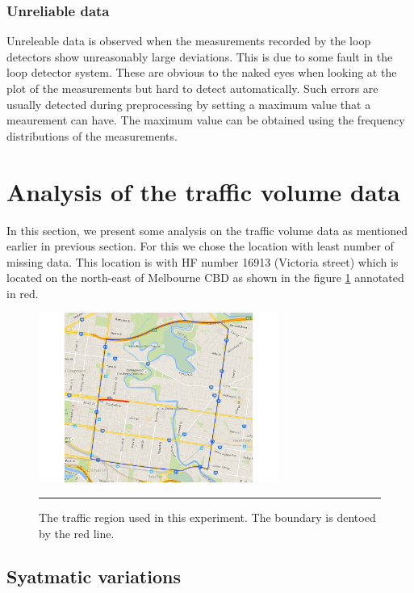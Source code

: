 \subsubsection{Unreliable data}
Unreleable data is observed when the measurements recorded by the loop detectors show unreasonably
large deviations. This is due to some fault in the loop detector system. These are obvious to the
naked eyes when looking at the plot of the measurements but hard to detect automatically. Such errors
are usually detected during preprocessing by setting a maximum value that a meaurement can have. The
maximum value can be obtained using the frequency distributions of the measurements.

\section{Analysis of the traffic volume data}

In this section, we present some analysis on the traffic volume data as mentioned earlier in previous
section. For this we chose the location with least number of missing data. This location is with HF
number 16913 (Victoria street) which is located on the north-east of Melbourne CBD as shown in the
figure \ref{fig:ExperimentRegion} annotated in red.

\begin{figure}[htbp]
  \centering
    \includegraphics[width=0.7\textwidth,height=0.7\textheight,keepaspectratio]{Figures/experiment-region.pdf}
    \rule{35em}{0.5pt}
  \caption[Experiment traffic region]{The traffic region used in this experiment. The boundary is
   dentoed by the red line.}
  \label{fig:ExperimentRegion}
\end{figure}


\subsection{Syatmatic variations}


